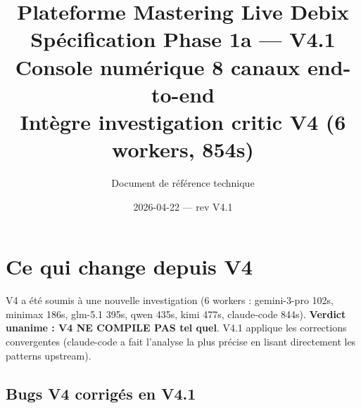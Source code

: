 \documentclass[11pt,a4paper]{article}
\title{\textbf{Plateforme Mastering Live Debix}\\[6pt]
  \Large Spécification Phase 1a --- \textbf{V4.1}\\[4pt]
  \large Console numérique 8 canaux end-to-end\\
  \normalsize Intègre investigation critic V4 (6 workers, 854s)}
\author{Document de référence technique}
\date{2026-04-22 --- rev V4.1}
\begin{document}
\maketitle
\tableofcontents
\clearpage

\section{Ce qui change depuis V4}

V4 a été soumis à une nouvelle investigation (6 workers : gemini-3-pro 102s, minimax 186s, glm-5.1 395s, qwen 435s, kimi 477s, claude-code 844s). \textbf{Verdict unanime : V4 NE COMPILE PAS tel quel}. V4.1 applique les corrections convergentes (claude-code a fait l'analyse la plus précise en lisant directement les patterns upstream).

\subsection{Bugs V4 corrigés en V4.1}
\end{document}

